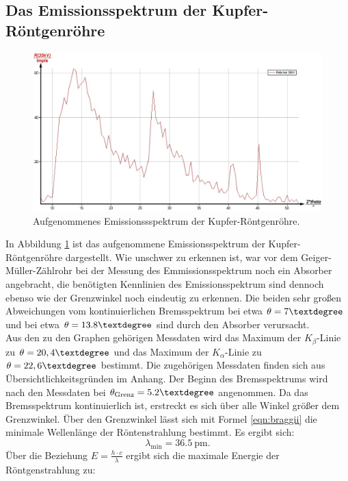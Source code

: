 \FloatBarrier
\subsection{Das Emissionsspektrum der Kupfer-Röntgenröhre}
\begin{figure}
	\centering
	\includegraphics[width=1.0\textwidth]{nIKO_und_jULIAN_ÜLADS/Kupfaemmision.jpg}
	\caption{Aufgenommenes Emissionssspektrum der Kupfer-Röntgenröhre.}
	\label{fig:emissionlol}
\end{figure}
In Abbildung \ref{fig:emissionlol} ist das aufgenommene Emissionsspektrum der Kupfer-Röntgenröhre dargestellt.
Wie unschwer zu erkennen ist, war vor dem Geiger-Müller-Zählrohr bei der Messung des Emmissionsspektrum noch ein Absorber angebracht, die benötigten Kennlinien des Emissionsspektrum sind dennoch ebenso wie der Grenzwinkel noch eindeutig zu erkennen.
Die beiden sehr großen Abweichungen vom kontinuierlichen Bremsspektrum bei etwa $\theta=7\textdegree$ und bei etwa $\theta=13.8\textdegree$ sind durch den Absorber verursacht.\\
Aus den zu den Graphen gehörigen Messdaten wird das Maximum der $K_\beta$-Linie zu
${\theta=20,4\textdegree}$ und das Maximum der $K_\alpha$-Linie zu ${\theta=22,6\textdegree}$ bestimmt. Die zugehörigen Messdaten finden sich aus Übersichtlichkeitsgründen im Anhang.
Der Beginn des Bremsspektrums wird nach den Messdaten bei ${\theta_\mathrm{Grenz}=5.2\textdegree}$ angenommen. Da das Bremsspektrum kontinuierlich ist, erstreckt es sich über alle Winkel größer dem Grenzwinkel.
Über den Grenzwinkel lässt sich mit Formel \eqref{eqn:braggii} die minimale Wellenlänge der Röntenstrahlung bestimmt.
Es ergibt sich:
\begin{equation*}
	 \lambda_\mathrm{min}=\SI{36.5}{\pico\meter} \text{.}
\end{equation*}
Über die Beziehung $E=\frac{h\cdot c}{\lambda}$ ergibt sich die maximale Energie der Röntgenstrahlung zu:
